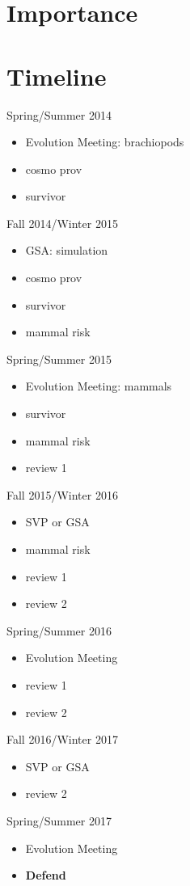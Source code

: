 \documentclass[12pt,letterpaper]{article}
\begin{document}
\section{Importance}

\clearpage
\section{Timeline}

Spring/Summer 2014
\begin{itemize}
  \item Evolution Meeting: brachiopods
  \item cosmo prov
  \item survivor
\end{itemize}

Fall 2014/Winter 2015
\begin{itemize}
  \item GSA: simulation
  \item cosmo prov
  \item survivor
  \item mammal risk
\end{itemize}

Spring/Summer 2015
\begin{itemize}
  \item Evolution Meeting: mammals
  \item survivor
  \item mammal risk
  \item review 1
\end{itemize}

Fall 2015/Winter 2016
\begin{itemize}
  \item SVP or GSA
  \item mammal risk
  \item review 1
  \item review 2
\end{itemize}

Spring/Summer 2016
\begin{itemize}
  \item Evolution Meeting
  \item review 1
  \item review 2
\end{itemize}

Fall 2016/Winter 2017
\begin{itemize}
  \item SVP or GSA
  \item review 2
\end{itemize}

Spring/Summer 2017
\begin{itemize}
  \item Evolution Meeting
  \item \textbf{Defend}
\end{itemize}



\clearpage


\end{document}
